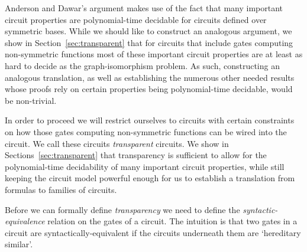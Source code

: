 \documentclass[../paper.tex]{subfiles}
\begin{document}

Anderson and Dawar's argument makes use of the fact that many important circuit
properties are polynomial-time decidable for circuits defined over symmetric
bases. While we should like to construct an analogous argument, we show in
Section~\ref{sec:transparent} that for circuits that include gates computing
non-symmetric functions most of these important circuit properties are at least
as hard to decide as the graph-isomorphism problem. As such, constructing an
analogous translation, as well as establishing the numerous other needed results
whose proofs rely on certain properties being polynomial-time decidable, would
be non-trivial.

In order to proceed we will restrict ourselves to circuits with certain
constraints on how those gates computing non-symmetric functions can be wired
into the circuit. We call these circuits \emph{transparent} circuits. We show in
Sections~\ref{sec:transparent} that transparency is sufficient to allow for the
polynomial-time decidability of many important circuit properties, while still
keeping the circuit model powerful enough for us to establish a translation from
formulas to families of circuits.

Before we can formally define \emph{transparency} we need to define the
\emph{syntactic-equivalence} relation on the gates of a circuit. The intuition
is that two gates in a circuit are syntactically-equivalent if the circuits
underneath them are `hereditary similar'.


\end{document}
